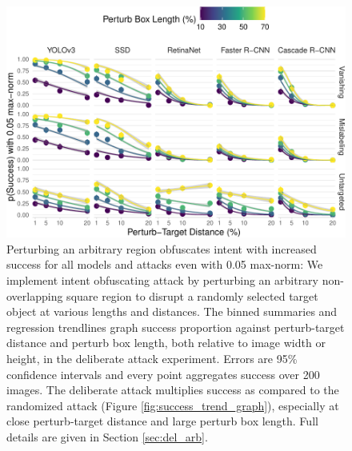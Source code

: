 \begin{figure}[tb]

{\centering \includegraphics[width=1\linewidth]{imgs/arbitrary_trend_graph_normed} 

}

\caption{Perturbing an arbitrary region obfuscates intent with increased success for all models and attacks even with 0.05 max-norm:  We implement intent obfuscating attack by perturbing an arbitrary non-overlapping square region to disrupt a randomly selected target object at various lengths and distances. The binned summaries and regression trendlines graph success proportion against perturb-target distance and perturb box length, both relative to image width or height, in the deliberate attack experiment. Errors are 95\% confidence intervals and every point aggregates success over 200 images. The deliberate attack multiplies success as compared to the randomized attack (Figure \ref{fig:success_trend_graph}), especially at close perturb-target distance and large perturb box length. Full details are given in Section \ref{sec:del_arb}.}\label{fig:arbitrary_trend_graph_normed}
\end{figure}

